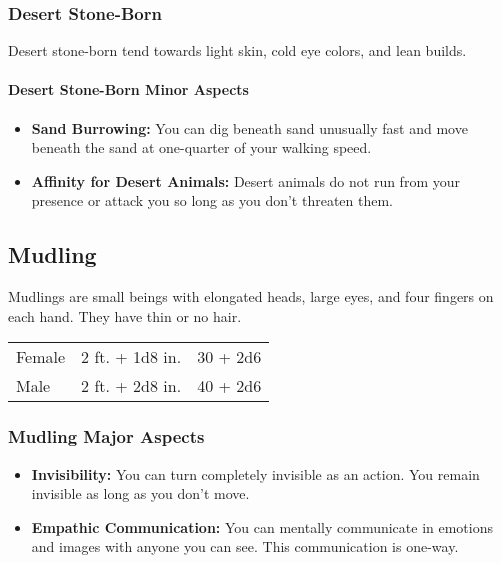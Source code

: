 \begin{multicols}{2}
\subsubsection{Desert Stone-Born}

Desert stone-born tend towards light skin, cold eye colors, and lean builds.

\paragraph{Desert Stone-Born Minor Aspects}

\begin{itemize}
    \item \textbf{Sand Burrowing:} You can dig beneath sand unusually fast and move beneath the sand at one-quarter of your walking speed.
    \item \textbf{Affinity for Desert Animals:} Desert animals do not run from your presence or attack you so long as you don't threaten them.
\end{itemize}

\subsection{Mudling}

Mudlings are small beings with elongated heads, large eyes, and four fingers on each hand. They
have thin or no hair.

\begin{center}
{
\begin{xtabular}{|l|l|l|}
Female & 2 ft. + 1d8 in. & 30 + 2d6 \\
Male & 2 ft. + 2d8 in. & 40 + 2d6 \\
\hline
\end{xtabular}
}
\end{center}

\subsubsection{Mudling Major Aspects}

\begin{itemize}
    \item \textbf{Invisibility:} You can turn completely invisible as an action. You remain invisible as long as you don't move.
    \item \textbf{Empathic Communication:} You can mentally communicate in emotions and images with anyone you can see. This communication is one-way.
\end{itemize}


\end{multicols}
